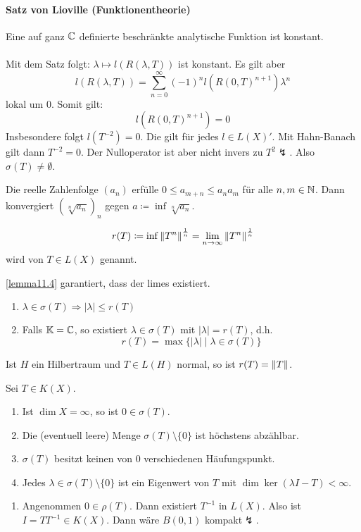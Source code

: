 \begin{beweis}
\begin{enumerate}
	\paragraph{Satz von Lioville (Funktionentheorie)}
		Eine auf ganz $ \mathbb{C} $ definierte beschr\"ankte analytische Funktion ist konstant.\\ \\
	Mit dem Satz folgt: $ \lambda\mapsto l(R(\lambda,T)) $ ist konstant. Es gilt aber
	\[ l(R(\lambda,T))=\sum_{n=0}^{\infty}(-1)^n l(R(0,T)^{n+1})\lambda^n \]
	lokal um $ 0 $. Somit gilt:
	\[ l(R(0,T)^{n+1}) =0\]
	Insbesondere folgt $ l(T^{-2})=0 $. Die gilt f\"ur jedes $ l\in L(X)' $. Mit Hahn-Banach gilt dann $ T^{-2}=0 $. Der Nulloperator ist aber nicht invers zu $ T^2\lightning $. Also $ \sigma(T)\neq\emptyset $.
\end{enumerate}
\end{beweis}
\begin{lemma}
	Die reelle Zahlenfolge $ (a_n) $ erf\"ulle $ 0\leq a_{m+n}\leq a_na_m $ f\"ur alle $ n,m\in\mathbb{N} $. Dann konvergiert $ (\sqrt[n]{a_n})_n $ gegen $ a\coloneqq\inf\sqrt[n]{a_n} $.
\end{lemma}
\begin{definition}
	\[ r(T)\coloneqq\inf\left\|T^n\right\|^\frac{1}{n}=\lim_{n\to\infty}\left\|T^n\right\|^\frac{1}{n} \]
	wird  von $ T\in L(X) $ genannt.
\end{definition}
\ref{lemma11.4} garantiert, dass der limes existiert.
\begin{satz}
	\bullshit
	\begin{enumerate}
		\item $ \lambda\in\sigma(T)\Rightarrow|\lambda|\leq r(T) $
		\item Falls $ \mathbb{K}=\mathbb{C} $, so existiert $ \lambda\in\sigma(T) $ mit $ |\lambda|=r(T) $, d.h. \[ r(T)=\max\lbrace |\lambda|\mid \lambda\in\sigma(T)\rbrace \]
	\end{enumerate}
\end{satz}
\begin{satz}
	Ist $ H $ ein Hilbertraum und $ T\in L(H) $ normal, so ist $ r(T)=\left\|T\right\| $.
\end{satz}
\begin{satz}
	Sei $ T\in K(X) $.
	\begin{enumerate}
		\item Ist $ \dim X=\infty $, so ist $ 0\in\sigma(T) $.
		\item Die (eventuell leere) Menge $ \sigma(T)\setminus\lbrace 0\rbrace $ ist h\"ochstens abz\"ahlbar.
		\item $ \sigma(T) $ besitzt keinen von $ 0 $ verschiedenen H\"aufungspunkt.
		\item Jedes $ \lambda\in\sigma(T)\setminus\lbrace 0\rbrace $ ist ein Eigenwert von $ T $ mit $ \dim\ker(\lambda I-T)<\infty $.
	\end{enumerate}
\end{satz}
\begin{beweis}
	\begin{enumerate}
		\item Angenommen $ 0\in\rho(T) $. Dann existiert $ T^{-1} $ in $ L(X) $. Also ist $ I=TT^{-1}\in K(X) $. Dann w\"are $ B(0,1) $ kompakt$ \lightning $.
	\end{enumerate}
\end{beweis}